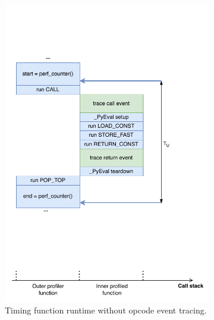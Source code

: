 \begin{figure}[H]
    \centering
    \begin{subfigure}[b]{0.45\textwidth}
       \centering
       \includegraphics[width=\textwidth]{images/profiling_bytecode/untraced_run.drawio.pdf}
       \vspace{0em}
       \caption{Timing function runtime without opcode event tracing.}
       \label{figure:profiler-untraced-run}
    \end{subfigure}
    \hfill
    \begin{subfigure}[b]{0.45\textwidth}
       \centering

\end{subfigure}
\end{figure}
